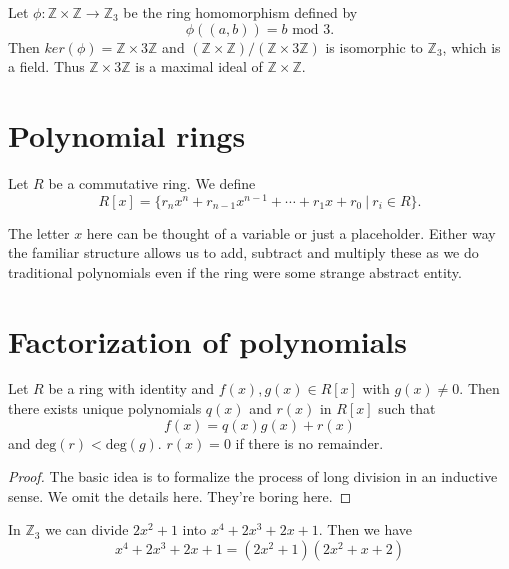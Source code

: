 \begin{example}
    Let $\phi: \mathbb{Z} \times \mathbb{Z} \to \mathbb{Z}_3$ be the ring homomorphism defined by 
    \[
        \phi((a,b)) = b \text{ mod }3.
    \]
    Then $ker(\phi) = \mathbb{Z} \times 3 \mathbb{Z}$ and $(\mathbb{Z} \times \mathbb{Z}) / (\mathbb{Z} \times 3 \mathbb{Z})$ 
    is isomorphic to $\mathbb{Z}_3$, which is a field. Thus $\mathbb{Z} \times 3\mathbb{Z}$ is a maximal ideal of 
    $\mathbb{Z} \times \mathbb{Z}$.
\end{example}

\section{Polynomial rings}

\begin{definition}
    Let $R$ be a commutative ring. We define 
    \begin{equation}
        R[x] = \{ r_nx^n + r_{n-1}x^{n-1} + \cdots + r_1 x + r_0 \> | \> r_i \in R \}.
    \end{equation}
\end{definition}

The letter $x$ here can be thought of a variable or just a placeholder. Either way the familiar structure 
allows us to add, subtract and multiply these as we do traditional polynomials even if the ring 
were some strange abstract entity.

\section{Factorization of polynomials}

\begin{theorem}
    Let $R$ be a ring with identity and $f(x),g(x) \in R[x]$ with 
    $g(x) \neq 0$. Then there exists unique polynomials 
    $q(x)$ and $r(x)$ in $R[x]$ such that 
    \begin{equation}
        f(x) = q(x) g(x) + r(x)
    \end{equation}
    and $\text{deg}(r) < \text{deg}(g)$. $r(x) = 0$ if there is no remainder.
\end{theorem}

\begin{proof}
    The basic idea is to formalize the process of long division in an inductive sense. We omit the details here. 
    They're boring here.
\end{proof}

\begin{example}
    In $\mathbb{Z}_3$ we can divide $2x^2 + 1$ into $x^4 + 2x^3 + 2x + 1$. Then we have 
    \[
        x^4 + 2x^3 + 2x + 1 = (2x^2 + 1)(2x^2 + x + 2)
    \]
\end{example}

